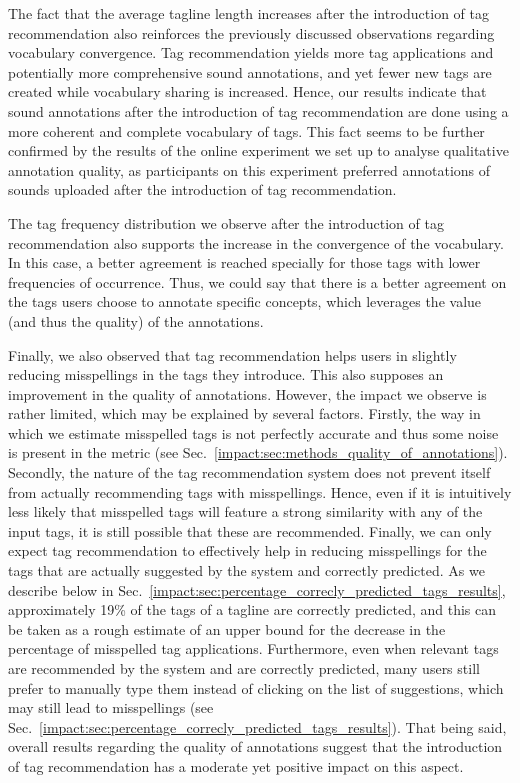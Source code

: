 The fact that the average tagline length increases after the introduction of tag recommendation also reinforces the previously discussed observations regarding vocabulary convergence. Tag recommendation yields more tag applications and potentially more comprehensive sound annotations, and yet fewer new tags are created while vocabulary sharing is increased. Hence, our results indicate that sound annotations after the introduction of tag recommendation are done using a more coherent and complete vocabulary of tags. This fact seems to be further confirmed by the results of the online experiment we set up to analyse qualitative annotation quality, as participants on this experiment preferred annotations of sounds uploaded after the introduction of tag recommendation.

The tag frequency distribution we observe after the introduction of tag recommendation also supports the increase in the convergence of the vocabulary. 
In this case, a better agreement is reached specially for those tags with lower frequencies of occurrence. Thus, we could say that there is a better agreement on the tags users choose to annotate specific concepts, which leverages the value (and thus the quality) of the annotations.

Finally, we also observed that tag recommendation helps users in slightly reducing misspellings in the tags they introduce. This also supposes an improvement in the quality of annotations. However, the impact we observe is rather limited, which may be explained by several factors. Firstly, the way in which we estimate misspelled tags is not perfectly accurate and thus some noise is present in the metric (see Sec.~\ref{impact:sec:methods_quality_of_annotations}). Secondly, the nature of the tag recommendation system does not prevent itself from actually recommending tags with misspellings. Hence, even if it is intuitively less likely that misspelled tags will feature a strong similarity with any of the input tags, it is still possible that these are recommended. 
Finally, we can only expect tag recommendation to effectively help in reducing misspellings for the tags that are actually suggested by the system and correctly predicted. As we describe below in Sec.~\ref{impact:sec:percentage_correcly_predicted_tags_results}, approximately 19\% of the tags of a tagline are correctly predicted, and this can be taken as a rough estimate of an upper bound for the decrease in the percentage of misspelled tag applications. Furthermore, even when relevant tags are recommended by the system and are correctly predicted, many users still prefer to manually type them instead of clicking on the list of suggestions, which may still lead to misspellings (see Sec.~\ref{impact:sec:percentage_correcly_predicted_tags_results}).
That being said, overall results regarding the quality of annotations suggest that the introduction of tag recommendation has a moderate yet positive impact on this aspect.


